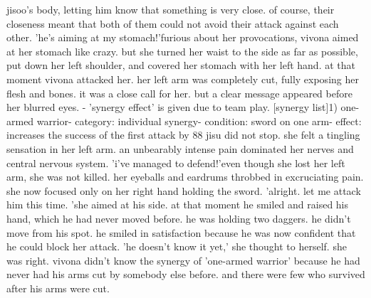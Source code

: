 jisoo's body, letting him know that something is very close.
of course, their closeness meant that both of them could not avoid their attack against each other.
'he's aiming at my stomach!'furious about her provocations, vivona aimed at her stomach like crazy.
but she turned her waist to the side as far as possible, put down her left shoulder, and covered her stomach with her left hand.
at that moment vivona attacked her.
 her left arm was completely cut, fully exposing her flesh and bones.
it was a close call for her.
 but a clear message appeared before her blurred eyes.
- 'synergy effect' is given due to team play.
[synergy list]1) one-armed warrior- category: individual synergy- condition: sword on one arm- effect: increases the success of the first attack by 88%
jisu did not stop.
 she felt a tingling sensation in her left arm.
 an unbearably intense pain dominated her nerves and central nervous system.
'i've managed to defend!'even though she lost her left arm, she was not killed.
her eyeballs and eardrums throbbed in excruciating pain.
 she now focused only on her right hand holding the sword.
'alright.
 let me attack him this time.
'she aimed at his side.
at that moment he smiled and raised his hand, which he had never moved before.
he was holding two daggers.
 he didn't move from his spot.
 he smiled in satisfaction because he was now confident that he could block her attack.
'he doesn't know it yet,' she thought to herself.
she was right.
 vivona didn't know the synergy of 'one-armed warrior' because he had never had his arms cut by somebody else before.
 and there were few who survived after his arms were cut.

